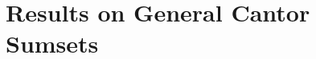 \documentclass{ws-ijnt}
\begin{document}
	
	\section{Results on General Cantor Sumsets}\label{section: GCS}
	
\end{document}
